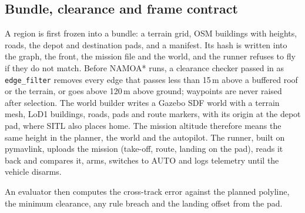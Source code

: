 \subsection{Bundle, clearance and frame contract}

A region is first frozen into a bundle: a terrain grid, OSM buildings with heights,
roads, the depot and destination pads, and a manifest. Its hash is written into the
graph, the front, the mission file and the world, and the runner refuses to fly if they
do not match. Before NAMOA* runs, a clearance checker passed in as \texttt{edge\_filter}
removes every edge that passes less than 15\,m above a buffered roof or the terrain, or
goes above 120\,m above ground; waypoints are never raised after selection. The world
builder writes a Gazebo SDF world with a terrain mesh, LoD1 buildings, roads, pads and
route markers, with its origin at the depot pad, where SITL also places home. The
mission altitude therefore means the same height in the planner, the world and the
autopilot. The runner, built on pymavlink, uploads the mission (take-off, route,
landing on the pad), reads it back and compares it, arms, switches to AUTO and logs
telemetry until the vehicle disarms.

An evaluator then computes the cross-track error against the planned polyline, the
minimum clearance, any rule breach and the landing offset from the pad.
